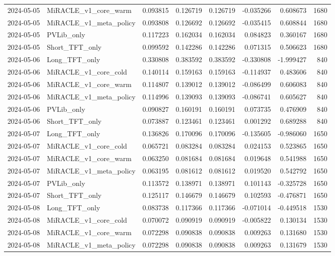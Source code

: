 \begin{tabular}{llrrrrrr}
2024-05-05 & MiRACLE_v1_core_warm & 0.093815 & 0.126719 & 0.126719 & -0.035266 & 0.608673 & 1680 \\
2024-05-05 & MiRACLE_v1_meta_policy & 0.093808 & 0.126692 & 0.126692 & -0.035415 & 0.608844 & 1680 \\
2024-05-05 & PVLib_only & 0.117223 & 0.162034 & 0.162034 & 0.084823 & 0.360167 & 1680 \\
2024-05-05 & Short_TFT_only & 0.099592 & 0.142286 & 0.142286 & 0.071315 & 0.506623 & 1680 \\
2024-05-06 & Long_TFT_only & 0.330808 & 0.383592 & 0.383592 & -0.330808 & -1.999427 & 840 \\
2024-05-06 & MiRACLE_v1_core_cold & 0.140114 & 0.159163 & 0.159163 & -0.114937 & 0.483606 & 840 \\
2024-05-06 & MiRACLE_v1_core_warm & 0.114807 & 0.139012 & 0.139012 & -0.086499 & 0.606083 & 840 \\
2024-05-06 & MiRACLE_v1_meta_policy & 0.114996 & 0.139093 & 0.139093 & -0.086741 & 0.605627 & 840 \\
2024-05-06 & PVLib_only & 0.090827 & 0.160191 & 0.160191 & 0.073735 & 0.476909 & 840 \\
2024-05-06 & Short_TFT_only & 0.073887 & 0.123461 & 0.123461 & 0.001292 & 0.689288 & 840 \\
2024-05-07 & Long_TFT_only & 0.136826 & 0.170096 & 0.170096 & -0.135605 & -0.986060 & 1650 \\
2024-05-07 & MiRACLE_v1_core_cold & 0.065721 & 0.083284 & 0.083284 & 0.024153 & 0.523865 & 1650 \\
2024-05-07 & MiRACLE_v1_core_warm & 0.063250 & 0.081684 & 0.081684 & 0.019648 & 0.541988 & 1650 \\
2024-05-07 & MiRACLE_v1_meta_policy & 0.063195 & 0.081612 & 0.081612 & 0.019520 & 0.542792 & 1650 \\
2024-05-07 & PVLib_only & 0.113572 & 0.138971 & 0.138971 & 0.101143 & -0.325728 & 1650 \\
2024-05-07 & Short_TFT_only & 0.125117 & 0.146679 & 0.146679 & 0.102593 & -0.476871 & 1650 \\
2024-05-08 & Long_TFT_only & 0.083738 & 0.117366 & 0.117366 & -0.071014 & -0.449518 & 1530 \\
2024-05-08 & MiRACLE_v1_core_cold & 0.070072 & 0.090919 & 0.090919 & -0.005822 & 0.130134 & 1530 \\
2024-05-08 & MiRACLE_v1_core_warm & 0.072298 & 0.090838 & 0.090838 & 0.009263 & 0.131680 & 1530 \\
2024-05-08 & MiRACLE_v1_meta_policy & 0.072298 & 0.090838 & 0.090838 & 0.009263 & 0.131679 & 1530 \\

\end{tabular}
